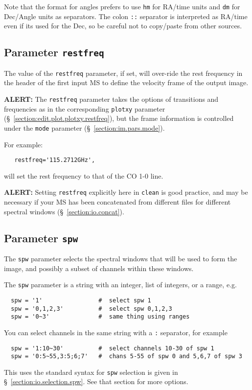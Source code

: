 Note that the format for angles prefers to use {\tt hm} for RA/time
units and {\tt dm} for Dec/Angle units as separators.  The colon
{\tt ::} separator is interpreted as RA/time even if its used for the
Dec, so be careful not to copy/paste from other sources.

\subsection{Parameter {\tt restfreq} }
\label{section:im.pars.restfreq}

The value of the {\tt restfreq} parameter, if set, will over-ride
the rest frequency in the header of the first input MS to define
the velocity frame of the output image.

{\bf ALERT:} The {\tt restfreq} parameter takes the options
of transitions and frequencies as in the corresponding {\tt plotxy}
parameter (\S~\ref{section:edit.plot.plotxy.restfreq}), but the
frame information is controlled under the {\tt mode} parameter
(\S~\ref{section:im.pars.mode}).

For example:
\small
\begin{verbatim}
   restfreq='115.2712GHz',
\end{verbatim}
\normalsize
will set the rest frequency to that of the CO 1-0 line.

{\bf ALERT:} Setting {\tt restfreq} explicitly here in
{\tt clean} is good practice, and may be necessary if your MS has
been concatenated from different files for different spectral
windows (\S~\ref{section:io.concat}).

\subsection{Parameter {\tt spw} }
\label{section:im.pars.spw}

The {\tt spw} parameter selects the spectral windows that will
be used to form the image, and possibly a subset of channels
within these windows.

The {\tt spw} parameter is a string with an integer, list
of integers, or a range, e.g.  
\small
\begin{verbatim}
  spw = '1'                #  select spw 1
  spw = '0,1,2,3'          #  select spw 0,1,2,3
  spw = '0~3'              #  same thing using ranges
\end{verbatim}
\normalsize
You can select channels in the same string with a {\tt :} separator,
for example
\small
\begin{verbatim}
  spw = '1:10~30'          #  select channels 10-30 of spw 1
  spw = '0:5~55,3:5;6;7'   #  chans 5-55 of spw 0 and 5,6,7 of spw 3
\end{verbatim}
\normalsize
This uses the standard syntax for {\tt spw} selection is given in 
\S~\ref{section:io.selection.spw}.  See that section for more
options.

